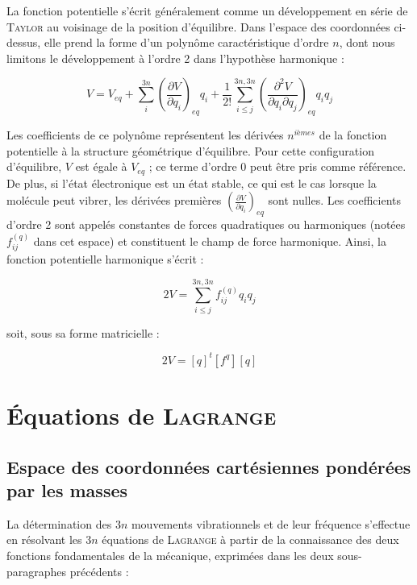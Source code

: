 La fonction potentielle s'écrit généralement comme un développement en série de \textsc{Taylor} au voisinage de la position d'équilibre. Dans l'espace des coordonnées ci-dessus, elle prend la forme d'un polynôme caractéristique d'ordre $n$, dont nous limitons le développement à l'ordre 2 dans l'hypothèse harmonique :

\begin{equation}
	V = V_{eq} + \sum^{3n}_i\left(\frac{\partial V}{\partial q_i}\right)_{eq} q_i + \frac{1}{2!} \sum^{3n,3n}_{i\leq j}\left(\frac {\partial^2 V}{\partial q_i \partial q_j}\right)_{eq} q_iq_j
\end{equation}

 Les coefficients de ce polynôme représentent les dérivées $n^{ièmes}$ de la fonction potentielle à la structure géométrique d'équilibre. Pour cette configuration d'équilibre, $V$ est égale à $V_{eq}$ ; ce terme d'ordre 0 peut être pris comme référence. De plus, si l'état électronique est un état stable, ce qui est le cas lorsque la molécule peut vibrer, les dérivées premières $\left(\frac{\partial V}{\partial q_i}\right)_{eq}$ sont nulles. Les coefficients d'ordre 2 sont appelés constantes de forces quadratiques ou harmoniques (notées $f^{(q)}_{ij}$ dans cet espace) et constituent le champ de force harmonique.
Ainsi, la fonction potentielle harmonique s'écrit :

\begin{equation}
	2V = \sum^{3n,3n}_{i\leq j} f^{(q)}_{ij} q_iq_j
\end{equation}

\noindent soit, sous sa forme matricielle :

\begin{equation}
	2V = \left[q\right]^t\left[ f^q\right]\left[q\right]
\end{equation}


\section{Équations de \textsc{Lagrange}}

\subsection{Espace des coordonnées cartésiennes pondérées par les masses}\label{esp_pond_masse}
 La détermination des $3n$ mouvements vibrationnels et de leur fréquence s'effectue en résolvant les $3n$ équations de \textsc{Lagrange} à partir de la connaissance des deux fonctions fondamentales de la mécanique, exprimées dans les deux sous-paragraphes précédents :
 

